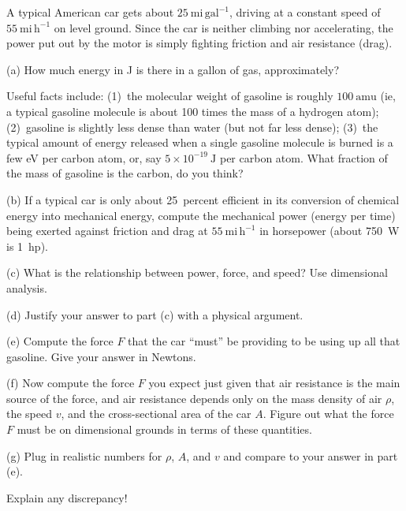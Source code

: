 \documentclass[12pt,letterpaper]{article}
\begin{document}
A typical American car gets about $25~\mathrm{mi\,gal^{-1}}$, driving
at a constant speed of $55~\mathrm{mi\,h^{-1}}$ on level ground.
Since the car is neither climbing nor accelerating, the power put out
by the motor is simply fighting friction and air resistance (drag).

(a) How much energy in J is there in a gallon of gas, approximately?

Useful facts include: (1)~the molecular weight of gasoline is roughly
$100~\mathrm{amu}$ (ie, a typical gasoline molecule is about 100 times
the mass of a hydrogen atom); (2)~gasoline is slightly less dense than
water (but not far less dense); (3)~the typical amount of energy
released when a single gasoline molecule is burned is a few eV per
carbon atom, or, say $5\times 10^{-19}~\mathrm{J}$ per carbon atom.
What fraction of the mass of gasoline is the carbon, do you think?

\vfill

(b) If a typical car is only about 25~percent efficient in its
conversion of chemical energy into mechanical energy, compute the
mechanical power (energy per time) being exerted against friction and
drag at $55~\mathrm{mi\,h^{-1}}$ in horsepower (about 750~W is 1~hp).

\vfill

(c) What is the relationship between power, force, and speed?  Use
dimensional analysis.

\vfill

(d) Justify your answer to part (c) with a physical argument.

\vfill

(e) Compute the force $F$ that the car ``must'' be providing to be
using up all that gasoline.  Give your answer in Newtons.

\vfill

(f) Now compute the force $F$ you expect just given that air
resistance is the main source of the force, and air resistance depends
only on the mass density of air $\rho$, the speed $v$, and the
cross-sectional area of the car $A$.  Figure out what the force $F$
must be on dimensional grounds in terms of these quantities.

\vfill

(g) Plug in realistic numbers for $\rho$, $A$, and $v$ and compare to
your answer in part (e).

\vfill

Explain any discrepancy!
\end{document}
